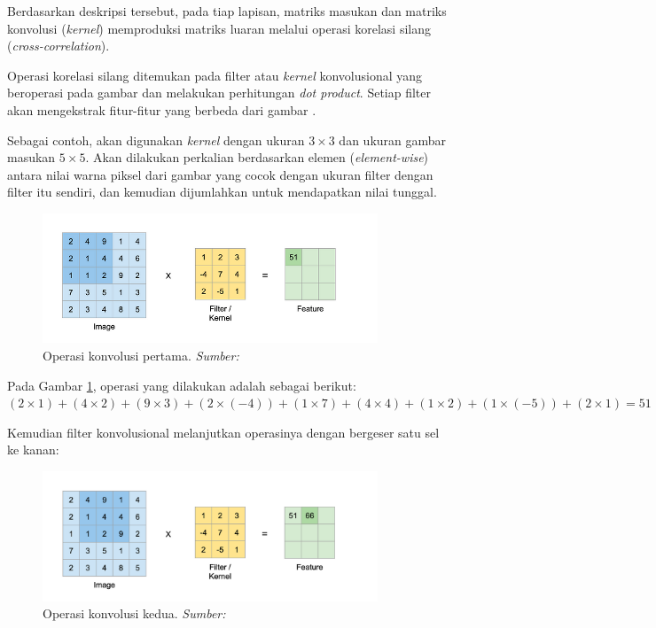 Berdasarkan deskripsi tersebut, pada tiap lapisan, matriks masukan dan matriks konvolusi (\emph{kernel}) memproduksi matriks luaran melalui operasi korelasi silang (\emph{cross-correlation}).

Operasi korelasi silang ditemukan pada filter atau \emph{kernel} konvolusional yang beroperasi pada  gambar dan melakukan perhitungan \emph{dot product}. Setiap filter akan mengekstrak fitur-fitur yang berbeda dari gambar \citep{patel_2020}. 

Sebagai contoh, akan digunakan \emph{kernel} dengan ukuran $3\times 3$ dan ukuran gambar masukan $5\times 5$. Akan dilakukan perkalian berdasarkan elemen (\emph{element-wise}) antara nilai warna piksel dari gambar yang cocok dengan ukuran filter dengan filter itu sendiri, dan kemudian dijumlahkan untuk mendapatkan nilai tunggal.

\begin{figure}[h]
    \centering
    \includegraphics[width=10cm]{gambar/convolution-operation1.png}
    \caption{Operasi konvolusi pertama. \emph{Sumber: \citep{patel_2020}}}
    \label{convolution_operation}
\end{figure}

Pada Gambar \ref{convolution_operation}, operasi yang dilakukan adalah sebagai berikut:
$(2 \times 1) + (4 \times 2) + (9 \times 3) + (2 \times (-4)) + (1 \times 7) + (4 \times 4) + (1 \times 2) + (1 \times (-5)) + (2 \times 1) = 51  $

Kemudian filter konvolusional melanjutkan operasinya dengan bergeser satu sel ke kanan:
\begin{figure}[h]
    \centering
    \includegraphics[width=10cm]{gambar/convolution-operation.png}
    \caption{Operasi konvolusi kedua. \emph{Sumber: \citep{patel_2020}}}
    \label{operasi_konvolusi_kedua}
\end{figure}

